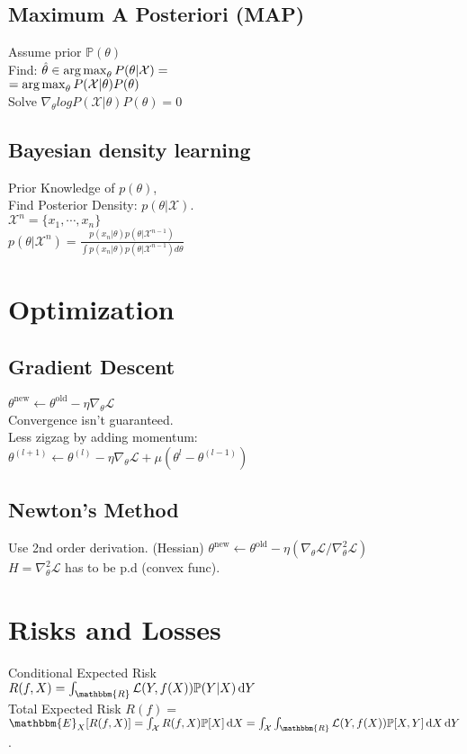\subsection*{Maximum A Posteriori (MAP)}
Assume prior $\mathbb{P}(\theta)$\\
Find: $\hat{\theta}\in \operatorname*{arg\,max}_\theta P(\theta|\mathcal{X}) =$\\
$=\operatorname*{arg\,max}_\theta P(\mathcal{X}|\theta)P(\theta)$\\
Solve $\nabla_\theta log P(\mathcal{X}|\theta)P(\theta)=0$

\subsection*{Bayesian density learning}
Prior Knowledge of $p(\theta)$,\\
Find Posterior Density: $p(\theta|\mathcal{X})$.\\
$\mathcal{X}^n=\{x_1, \cdots, x_n\}$\\
$p(\theta|\mathcal{X}^n)=\frac{p(x_n|\theta)p(\theta|\mathcal{X}^{n-1})}{\int p(x_n|\theta)p(\theta|\mathcal{X}^{n-1}) d\theta}$

\section*{Optimization}
\subsection*{Gradient Descent}
$\theta^{\mathrm{new}}\leftarrow\theta^{\mathrm{old}}-\eta\nabla_{\theta}\mathcal{L}$\\
Convergence isn't guaranteed.\\
Less zigzag by adding momentum: \\$\theta^{(l+1)}\leftarrow\theta^{(l)}-\eta\nabla_{\theta}\mathcal{L}+\mu(\theta^{l}-\theta^{(l-1)})$

\subsection*{Newton's Method}
Use 2nd order derivation. (Hessian)
$\theta^{\mathrm{new}}\leftarrow\theta^{\mathrm{old}}-\eta(\nabla_{\theta}\mathcal{L}/\nabla^2_{\theta}\mathcal{L})$\\
$H=\nabla^2_{\theta}\mathcal{L}$ has to be p.d (convex func).

\section*{Risks and Losses}
Conditional Expected Risk\\
$R(f, X) = \int_{\mathbbm{R}} \mathcal{L}(Y,f(X))\mathbb{P}(Y|X)\di Y$\\
Total Expected Risk
$R(f) =$\\
$\mathbbm{E}_{X}[R(f,X)] =\int_{\mathcal{X}}R(f,X)\mathbb{P}[X]\di X =
\int_{\mathcal{X}}\int_{\mathbbm{R}} \mathcal{L}(Y,f(X))\mathbb{P}[X,Y]\di X\di Y$.


